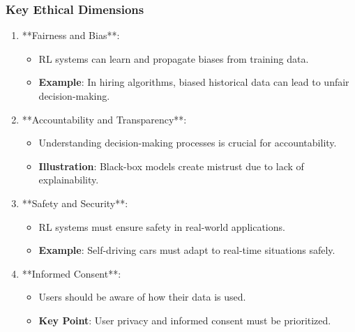 \documentclass[aspectratio=169]{beamer}
\begin{document}
\begin{frame}[fragile]
    \frametitle{Key Ethical Dimensions}
    \begin{enumerate}
        \item **Fairness and Bias**:
        \begin{itemize}
            \item RL systems can learn and propagate biases from training data.
            \item \textbf{Example}: In hiring algorithms, biased historical data can lead to unfair decision-making.
        \end{itemize}
        
        \item **Accountability and Transparency**:
        \begin{itemize}
            \item Understanding decision-making processes is crucial for accountability.
            \item \textbf{Illustration}: Black-box models create mistrust due to lack of explainability.
        \end{itemize}
        
        \item **Safety and Security**:
        \begin{itemize}
            \item RL systems must ensure safety in real-world applications.
            \item \textbf{Example}: Self-driving cars must adapt to real-time situations safely.
        \end{itemize}
        
        \item **Informed Consent**:
        \begin{itemize}
            \item Users should be aware of how their data is used.
            \item \textbf{Key Point}: User privacy and informed consent must be prioritized.
        \end{itemize}
    \end{enumerate}
\end{frame}
\end{document}
